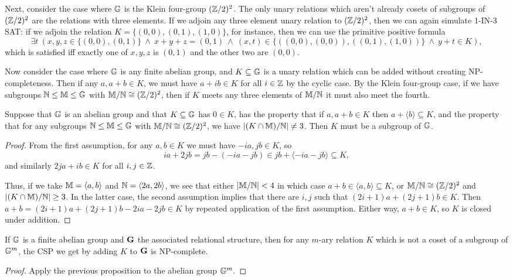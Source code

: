 \documentclass[letterpaper,11pt]{article}
\begin{document}
Next, consider the case where $\mathbb{G}$ is the Klein four-group $(\mathbb{Z}/2)^2$. The only unary relations which aren't already cosets of subgroups of $(\mathbb{Z}/2)^2$ are the relations with three elements. If we adjoin any three element unary relation to $(\mathbb{Z}/2)^2$, then we can again simulate 1-IN-3 SAT: if we adjoin the relation $K = \{(0,0),(0,1),(1,0)\}$, for instance, then we can use the primitive positive formula
\[
\exists t\ (x,y,z \in \{(0,0),(0,1)\}\ \wedge\ x+y+z = (0,1)\ \wedge\ (x,t) \in \{((0,0),(0,0)), ((0,1),(1,0))\}\ \wedge\ y+t \in K),
\]
which is satisfied iff exactly one of $x,y,z$ is $(0,1)$ and the other two are $(0,0)$.

Now consider the case where $\mathbb{G}$ is any finite abelian group, and $K \subseteq \mathbb{G}$ is a unary relation which can be added without creating NP-completeness. Then if any $a,a+b \in K$, we must have $a+ib \in K$ for all $i \in \mathbb{Z}$ by the cyclic case. By the Klein four-group case, if we have subgroups $\mathbb{N} \le \mathbb{M} \le \mathbb{G}$ with $\mathbb{M}/\mathbb{N} \cong (\mathbb{Z}/2)^2$, then if $K$ meets any three elements of $\mathbb{M}/\mathbb{N}$ it must also meet the fourth.

\begin{prop} Suppose that $\mathbb{G}$ is an abelian group and that $K \subseteq \mathbb{G}$ has $0 \in K$, has the property that if $a,a+b \in K$ then $a+\langle b\rangle \subseteq K$, and the property that for any subgroups $\mathbb{N} \le \mathbb{M} \le \mathbb{G}$ with $\mathbb{M}/\mathbb{N} \cong (\mathbb{Z}/2)^2$, we have $|(K\cap \mathbb{M})/\mathbb{N}| \ne 3$. Then $K$ must be a subgroup of $\mathbb{G}$.
\end{prop}
\begin{proof} From the first assumption, for any $a,b \in K$ we must have $-ia, jb \in K$, so
\[
ia+2jb = jb-(-ia-jb) \in jb+\langle -ia - jb\rangle \subseteq K,
\]
and similarly $2ja+ib \in K$ for all $i,j \in \mathbb{Z}$.

Thus, if we take $\mathbb{M} = \langle a,b\rangle$ and $\mathbb{N} = \langle 2a,2b \rangle$, we see that either $|\mathbb{M}/\mathbb{N}| < 4$ in which case $a+b \in \langle a,b \rangle \subseteq K$, or $\mathbb{M}/\mathbb{N} \cong (\mathbb{Z}/2)^2$ and $|(K\cap \mathbb{M})/\mathbb{N}| \ge 3$. In the latter case, the second assumption implies that there are $i,j$ such that $(2i+1)a+(2j+1)b \in K$. Then $a+b = (2i+1)a+(2j+1)b-2ia-2jb \in K$ by repeated application of the first assumption. Either way, $a+b \in K$, so $K$ is closed under addition.
\end{proof}

\begin{cor} If $\mathbb{G}$ is a finite abelian group and $\mathbf{G}$ the associated relational structure, then for any $m$-ary relation $K$ which is not a coset of a subgroup of $\mathbb{G}^m$, the CSP we get by adding $K$ to $\mathbf{G}$ is NP-complete.
\end{cor}
\begin{proof} Apply the previous proposition to the abelian group $\mathbb{G}^m$.
\end{proof}
\end{document}

